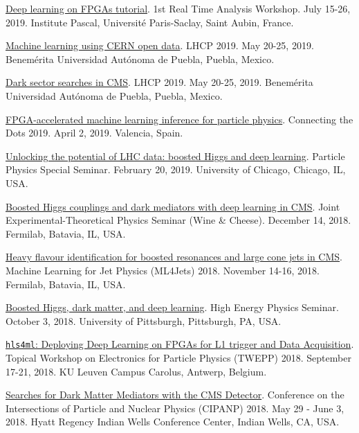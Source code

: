 \documentclass[11pt]{res}
\begin{document}
\begin{resume}
\href{https://indico.cern.ch/event/793125/contributions/3495251/}{Deep learning on FPGAs tutorial}. 1st Real Time Analysis Workshop. July 15-26, 2019. Institute Pascal, Universit\'{e} Paris-Saclay, Saint Aubin, France.

\href{https://indico.cern.ch/event/687651/contributions/3428206/}{Machine learning using CERN open data}. LHCP 2019. May 20-25, 2019. Benem\'{e}rita Universidad Aut\'{o}noma de Puebla, Puebla, Mexico.

\href{https://indico.cern.ch/event/687651/contributions/3426898/}{Dark sector searches in CMS}. LHCP 2019. May 20-25, 2019. Benem\'{e}rita Universidad Aut\'{o}noma de Puebla, Puebla, Mexico.

\href{https://indico.cern.ch/event/742793/contributions/3274392/}{FPGA-accelerated machine learning inference for particle physics}. Connecting the Dots 2019. April 2, 2019. Valencia, Spain.

\href{https://universityofchicago.hosted.panopto.com/Panopto/Pages/Viewer.aspx?id=66ca09d7-74c1-4b12-bb57-a9fa01046cdf}{Unlocking the potential of LHC data: boosted Higgs and deep learning}. Particle Physics Special Seminar. February 20, 2019. University of Chicago, Chicago, IL, USA.

\href{http://theory.fnal.gov/events/event/results-from-cms-18/}{Boosted Higgs couplings and dark mediators with deep learning in CMS}. Joint Experimental-Theoretical Physics Seminar (Wine \& Cheese). December 14, 2018. Fermilab, Batavia, IL, USA.

\href{https://indico.cern.ch/event/745718/contributions/3211982/}{Heavy flavour identification for boosted resonances and large cone jets in CMS}. Machine Learning for Jet Physics (ML4Jets) 2018. November 14-16, 2018. Fermilab, Batavia, IL, USA.

\href{https://www.physicsandastronomy.pitt.edu/events/hep-seminar-javier-duarte-fermilab}{Boosted Higgs, dark matter, and deep learning}. High Energy Physics Seminar. October 3, 2018. University of Pittsburgh, Pittsburgh, PA, USA.

\href{https://indico.cern.ch/event/697988/contributions/3055990/}{\texttt{hls4ml}: Deploying Deep Learning on FPGAs for L1 trigger and Data Acquisition}. Topical Workshop on Electronics for Particle Physics (TWEPP) 2018. September 17-21, 2018. KU Leuven Campus Carolus, Antwerp, Belgium.

\href{https://conferences.lbl.gov/event/137/session/27/contribution/354}{Searches for Dark Matter Mediators with the CMS Detector}. Conference on the Intersections of Particle and Nuclear Physics (CIPANP) 2018. May 29 - June 3, 2018. Hyatt Regency Indian Wells Conference Center, Indian Wells, CA, USA.


\end{resume}
\end{document}
